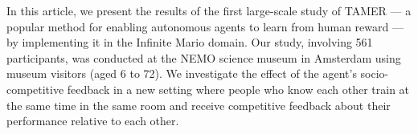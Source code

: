 \documentclass[10pt,journal,compsoc]{IEEEtran}
\begin{document}



In this article, we present the results of the first large-scale study of TAMER --- a popular method for enabling autonomous agents to learn from human reward \cite{knox2009interactively} --- by implementing it in the Infinite Mario domain. 
Our study, involving 561 participants, was conducted at the NEMO science museum in Amsterdam using museum visitors (aged 6 to 72). We investigate the effect of the agent's socio-competitive feedback in a new setting 
where people who know each other train at the same time in the same room and receive competitive feedback about their performance relative to each other. %
\end{document}
